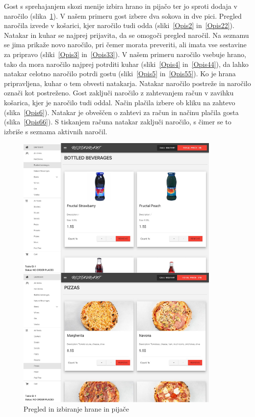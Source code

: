 \documentclass[a4paper, 12pt]{book}
\begin{document}
Gost s sprehajanjem skozi menije izbira hrano in pijačo ter jo sproti dodaja v naročilo (slika~\ref{Opis1}).
V našem primeru gost izbere dva sokova in dve pici. Pregled naročila izvede v košarici, kjer naročilo tudi odda (sliki~\ref{Opis2} in~\ref{Opis22}). Natakar in kuhar se najprej prijavita, da se omogoči pregled naročil. Na seznamu se jima prikaže novo naročilo, pri čemer morata preveriti, ali imata vse sestavine za pripravo (sliki~\ref{Opis3} in~\ref{Opis33}). V našem primeru naročilo vsebuje hrano, tako da mora naročilo najprej potrditi kuhar (sliki~\ref{Opis4} in~\ref{Opis44}), da lahko natakar celotno naročilo potrdi gostu (sliki~\ref{Opis5} in~\ref{Opis55}). Ko je hrana pripravljena, kuhar o tem obvesti natakarja. Natakar naročilo postreže in naročilo označi kot postreženo. Gost zaključi naročilo z zahtevanjem račun v zavihku košarica, kjer je naročilo tudi oddal. Način plačila izbere ob kliku na zahtevo (slika~\ref{Opis6}). Natakar je obveščen o zahtevi za račun in načinu plačila gosta (slika~\ref{Opis66}). S tiskanjem računa natakar zaključi naročilo, s čimer se to izbriše s seznama aktivnih naročil.
\begin{figure}[!htb]
\centering
\includegraphics[width=10cm]{narocanje.jpg}
\caption{Pregled in izbiranje hrane in pijače}
\label{Opis1}
\end{figure}
\end{document}
